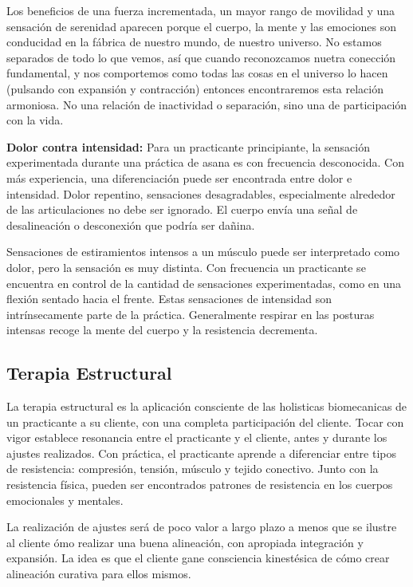 Los beneficios de una fuerza incrementada, un mayor rango de movilidad y una sensación de serenidad aparecen porque el cuerpo, la mente y las emociones son conducidad en la fábrica de nuestro mundo, de nuestro universo. No estamos separados de todo lo que vemos, así que cuando reconozcamos nuetra conección fundamental, y nos comportemos como todas las cosas en el universo lo hacen (pulsando con expansión y contracción) entonces encontraremos esta relación armoniosa. No una relación de inactividad o separación, sino una de participación con la vida.

\textbf{Dolor contra intensidad:}
Para un practicante principiante, la sensación experimentada durante una práctica de asana es con frecuencia desconocida. Con más experiencia, una diferenciación puede ser encontrada entre dolor e intensidad. Dolor repentino, sensaciones desagradables, especialmente alrededor de las articulaciones no debe ser ignorado. El cuerpo envía una señal de desalineación o desconexión que podría ser dañina.

Sensaciones de estiramientos intensos a un músculo puede ser interpretado como dolor, pero la sensación es muy distinta. Con frecuencia un practicante se encuentra en control de la cantidad de sensaciones experimentadas, como en una flexión sentado hacia el frente. Estas sensaciones de intensidad son intrínsecamente parte de la práctica. Generalmente respirar en las posturas intensas recoge la mente del cuerpo y la resistencia decrementa.

\subsection{Terapia Estructural}

La terapia estructural es la aplicación consciente de las holisticas biomecanicas de un practicante a su cliente, con una completa participación del cliente. Tocar con vigor establece resonancia entre el practicante y el cliente, antes y durante los ajustes realizados. Con práctica, el practicante aprende a diferenciar entre tipos de resistencia: compresión, tensión, músculo y tejido conectivo. Junto con la resistencia física, pueden ser encontrados patrones de resistencia en los cuerpos emocionales y mentales.

La realización de ajustes será de poco valor a largo plazo a menos que se ilustre al cliente ómo realizar una buena alineación, con apropiada integración y expansión. La idea es que el cliente gane consciencia kinestésica de cómo crear alineación curativa para ellos mismos.


